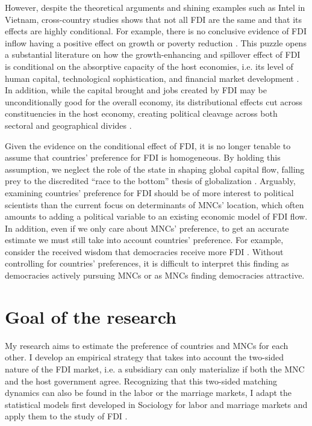 However, despite the theoretical arguments and shining examples such as Intel in
Vietnam, cross-country studies shows that
not all FDI are the same and that its effects are highly conditional. For
example, there is no conclusive evidence of FDI inflow having a positive effect on
growth \citep{Nair-Reichert2001, Carkovic2002} or poverty reduction
\citep{Guerra2009}. This puzzle opens a substantial literature on how the
growth-enhancing and spillover effect of FDI is conditional on the absorptive
capacity of the host economies, i.e. its level of human capital, technological
sophistication, and financial market development \citep{Durham2004,
  Nunnenkamp2004, Fu2008, Willem2004}. In addition, while the capital brought
and jobs created by FDI may be unconditionally good for the overall economy, its
distributional effects cut across constituencies in the host economy, creating
political cleavage across both sectoral and geographical divides
\citep{Chintrakarn2012, Goldberg2007, Nunnenkamp2007}.

Given the evidence on the conditional effect of FDI, it is no longer tenable to
assume that countries' preference for FDI is homogeneous. By holding this
assumption, we neglect the role of the state in shaping global capital flow,
falling prey to the discredited ``race to the bottom'' thesis of globalization
\citep{Mosley2005}. Arguably, examining countries' preference for FDI should be
of more interest to political scientists than the current focus on determinants
of MNCs' location, which often amounts to adding a political variable to an
existing economic model of FDI flow. In addition, even if we only care about
MNCs' preference, to get an accurate estimate we must still take into account
countries' preference. For example, consider the received wisdom that
democracies receive more FDI \citep{Jensen2008a}. Without controlling for
countries' preferences, it is difficult to interpret this finding as democracies
actively pursuing MNCs or as MNCs finding democracies attractive.

\section{Goal of the research}

My research aims to estimate the preference of countries and MNCs for each
other. I develop an empirical strategy that takes into account the two-sided
nature of the FDI market, i.e. a subsidiary can only materialize if both the MNC
and the host government agree. Recognizing that this two-sided matching dynamics
can also be found in the labor or the marriage markets, I adapt the statistical
models first developed in Sociology for labor and marriage markets and apply
them to the study of FDI \citep{Logan1996, Logan2008}.


